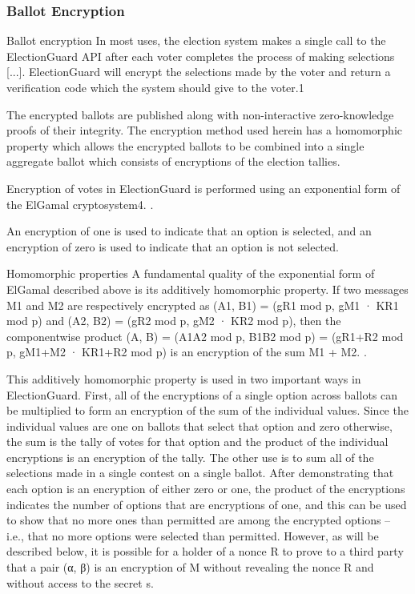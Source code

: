 \subsubsection{Ballot Encryption}
Ballot encryption In most uses, the election system makes a single call to the ElectionGuard API after each voter
completes the process of making selections [...]. ElectionGuard will encrypt
the selections made by the voter and return a verification code which the system should give to the voter.1
\cite[3]{eg-spec}

The encrypted ballots are published along with non-interactive zero-knowledge proofs of their integrity. The encryption
method used herein has a homomorphic property which allows the encrypted ballots to be combined into a single aggregate
ballot which consists of encryptions of the election tallies.
\cite[3]{eg-spec}

Encryption of votes in ElectionGuard is performed using an exponential form of the ElGamal cryptosystem4.
\cite[4]{eg-spec}.

An encryption of one is used to indicate that an option is selected, and an encryption of zero is used to indicate that
an option is not selected.\cite[5]{eg-spec}

Homomorphic properties A fundamental quality of the exponential form of ElGamal described above is its additively
homomorphic property. If two messages M1 and M2 are respectively encrypted as (A1, B1) = (gR1 mod p, gM1 · KR1 mod p)
and (A2, B2) = (gR2 mod p, gM2 · KR2 mod p), then the componentwise product (A, B) = (A1A2 mod p, B1B2 mod p) = (gR1+R2
mod p, gM1+M2 · KR1+R2 mod p) is an encryption of the sum M1 + M2.
\cite[5]{eg-spec}.

This additively homomorphic property is used in two important ways in ElectionGuard. First, all of the encryptions of a
single option across ballots can be multiplied to form an encryption of the sum of the individual values. Since the
individual values are one on ballots that select that option and zero otherwise, the sum is the tally of votes for that
option and the product of the individual encryptions is an encryption of the tally. The other use is to sum all of the
selections made in a single contest on a single ballot. After demonstrating that each option is an encryption of either
zero or one, the product of the encryptions indicates the number of options that are encryptions of one, and this can be
used to show that no more ones than permitted are among the encrypted options – i.e., that no more options were selected
than permitted. However, as will be described below, it is possible for a holder of a nonce R to prove to a third party
that a pair (α, β) is an encryption of M without revealing the nonce R and without access to the secret s.
\cite[5]{eg-spec}

